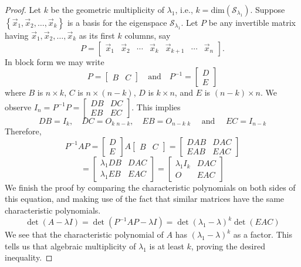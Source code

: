 \documentclass{ximera}
\begin{document}
\begin{proof}
Let $k$ be the geometric multiplicity of $\lambda_1$, i.e., $k=\mbox{dim}(\mathcal{S}_{\lambda_1})$.  Suppose $\left\{\vec{x}_1, \vec{x}_2, \ldots ,\vec{x}_k\right\}$ is a basis for the eigenspace $\mathcal{S}_{\lambda_1}$.  Let $P$ be any invertible matrix having $\vec{x}_1,  \vec{x}_2, \ldots ,\vec{x}_k$ as its first $k$ columns, say 
$$P=\begin{bmatrix}
\vec{x}_1 & \vec{x}_2 & \cdots & \vec{x}_k & \vec{x}_{k+1} & \cdots & \vec{x}_n
\end{bmatrix}.$$  
In block form we may write 
$$P=\begin{bmatrix}
B&C
\end{bmatrix} \quad \text{and} \quad P^{-1}=\begin{bmatrix}
D \\
E
\end{bmatrix}$$
where $B$ is $n \times k$, $C$ is  $n \times (n-k)$, $D$ is $k \times n$, and $E$ is $(n-k) \times n$.  We observe
$I_n = P^{-1}P = \left[\begin{array}{c|c}  
DB & DC \\ \hline
EB & EC
 \end{array}\right] $. 
This implies
$$DB = I_k,\quad DC=O_{k\,\,n-k},\quad EB = O_{n-k\,\,k} \quad\text{ and }\quad EC = I_{n-k}$$
Therefore,
\begin{equation*}
P^{-1}AP=\begin{bmatrix}
D \\
E
\end{bmatrix} 
A
\begin{bmatrix}
B&C
\end{bmatrix} =
\left[\begin{array}{c|c}  
DAB & DAC \\ \hline
EAB & EAC
 \end{array}\right]
\end{equation*}
\begin{equation*}
=  \left[\begin{array}{c|c}  
\lambda_1 DB & DAC \\ \hline
\lambda_1 EB & EAC
 \end{array}\right]  
=  \left[\begin{array}{c|c}  
\lambda_1 I_k & DAC \\ \hline
O & EAC
 \end{array}\right]  
\end{equation*}
We finish the proof by comparing the characteristic polynomials on both sides of this equation, and making use of the fact that similar matrices have the same characteristic polynomials.  
$$\det(A-\lambda I) = \det(P^{-1}AP-\lambda I)=\det(\lambda_1 - \lambda)^k \det(EAC)$$
We see that the characteristic polynomial of $A$ has $(\lambda_1 - \lambda)^k$ as a factor.  This tells us that algebraic multiplicity of $\lambda_1$ is at least $k$, proving the desired inequality. 
\end{proof}
\end{document}
